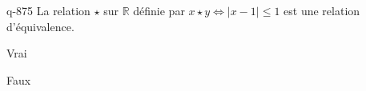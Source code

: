 \begin{truefalse}{q-875}
La relation $\star$ sur $\mathbb R$ définie par $x\star y \iff |x-1|\leq 1$ est une relation d'équivalence.
\item Vrai
\item* Faux
\end{truefalse}

